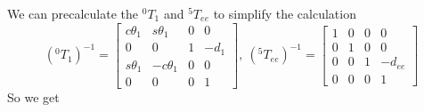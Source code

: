 \documentclass[utf8]{article}
\begin{document}
We can precalculate the $^0T_1$ and $^5T_{ee}$ to simplify the calculation
\begin{equation}
(^0T_1)^{-1} = \left[
\begin{matrix}
c\theta_1 & s\theta_1 & 0 & 0\\
0 & 0 & 1 & -d_1\\
s\theta_1 & -c\theta_1 & 0 & 0\\
0 & 0 & 0 & 1
\end{matrix}
\right],\ 
(^5T_{ee})^{-1} = \left[
\begin{matrix}
1 & 0 & 0 & 0\\
0 & 1 & 0 & 0\\
0 & 0 & 1 & -d_{ee}\\
0 & 0 & 0 & 1
\end{matrix}
\right]
\end{equation}
So we get
\end{document}
